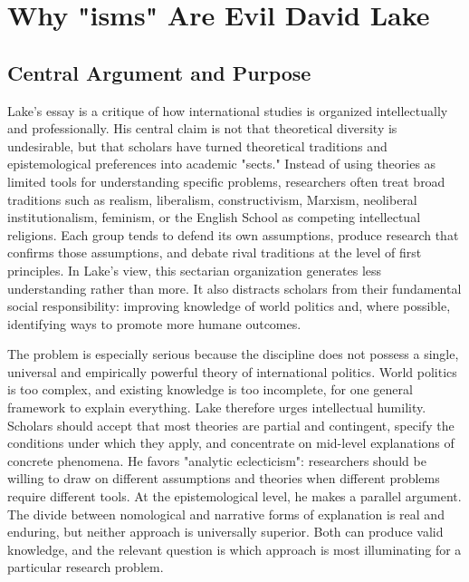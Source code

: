 
\section{Why "isms" Are Evil David Lake}
\cite{cranmerWhatCanWe2017}



\subsection{Central Argument and
Purpose}

Lake's essay is a critique of how international studies is organized
intellectually and professionally. His central claim is not that
theoretical diversity is undesirable, but that scholars have turned
theoretical traditions and epistemological preferences into academic
"sects." Instead of using theories as limited tools for understanding
specific problems, researchers often treat broad traditions such as
realism, liberalism, constructivism, Marxism, neoliberal
institutionalism, feminism, or the English School as competing
intellectual religions. Each group tends to defend its own assumptions,
produce research that confirms those assumptions, and debate rival
traditions at the level of first principles. In Lake's view, this
sectarian organization generates less understanding rather than more. It
also distracts scholars from their fundamental social responsibility:
improving knowledge of world politics and, where possible, identifying
ways to promote more humane outcomes.

The problem is especially serious because the discipline does not
possess a single, universal and empirically powerful theory of
international politics. World politics is too complex, and existing
knowledge is too incomplete, for one general framework to explain
everything. Lake therefore urges intellectual humility. Scholars should
accept that most theories are partial and contingent, specify the
conditions under which they apply, and concentrate on mid-level
explanations of concrete phenomena. He favors "analytic eclecticism":
researchers should be willing to draw on different assumptions and
theories when different problems require different tools. At the
epistemological level, he makes a parallel argument. The divide between
nomological and narrative forms of explanation is real and enduring, but
neither approach is universally superior. Both can produce valid
knowledge, and the relevant question is which approach is most
illuminating for a particular research problem.

